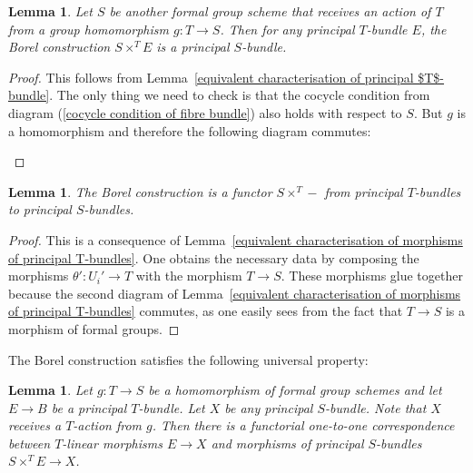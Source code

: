 \documentclass[10pt,oneside]{amsart}
\newtheorem{lemma}[theorem]{Lemma}
\theoremstyle{definition}
\begin{document}
	\begin{lemma}
		Let $S$ be another formal group scheme that receives an action of $T$ from a group homomorphism $g:T\rightarrow S$. Then for any principal $T$-bundle $E$, the Borel construction $S\times^T E$ is a principal $S$-bundle.
	\end{lemma}
	\begin{proof}
		This follows from Lemma~\ref{equivalent characterisation of principal $T$-bundle}. The only thing we need to check is that the cocycle condition from diagram (\ref{cocycle condition of fibre bundle}) also holds with respect to $S$. But $g$ is a homomorphism and therefore the following diagram commutes:
		\begin{center}
		\end{center}
		
		
	\end{proof}
	
	
	\begin{lemma}\label{change of fibre is functorial}
		The Borel construction is a functor $S\times^T -$ from principal $T$-bundles to principal $S$-bundles.
	\end{lemma}
	\begin{proof}
		This is a consequence of Lemma~\ref{equivalent characterisation of morphisms of principal T-bundles}. One obtains the necessary data by composing the morphisms $\theta':U_i'\rightarrow T$ with the morphism $T\rightarrow S$. These morphisms glue together because the second diagram of Lemma~\ref{equivalent characterisation of morphisms of principal T-bundles} commutes, as one easily sees from the fact that $T\rightarrow S$ is a morphism of formal groups. 
	\end{proof}
	
	The Borel construction satisfies the following universal property:
	\begin{lemma}\label{universal property of associated fibre construction for principal bundles}
		Let $g:T\rightarrow S$ be a homomorphism of formal group schemes and let $E\rightarrow B$ be a principal $T$-bundle. Let $X$ be any principal $S$-bundle. Note that $X$ receives a $T$-action from $g$. Then there is a functorial one-to-one correspondence between $T$-linear morphisms $E\rightarrow X$ and morphisms of principal $S$-bundles $S\times^T E\rightarrow X$.
	\end{lemma}
	
\end{document}
